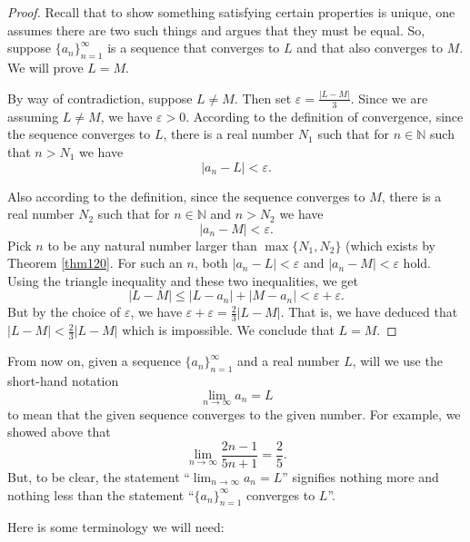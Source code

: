 \documentclass[12pt]{amsart}
\def\e{\varepsilon}
\newcommand{\N}{\mathbb{N}}
\numberwithin{equation}{section}
\theoremstyle{plain} %
\theoremstyle{definition}
\theoremstyle{remark}
\begin{document}
\begin{proof} Recall that to show something satisfying certain properties is unique, one assumes there are two such things and argues that they must be equal. 
So,
suppose $\{a_n\}_{n=1}^\infty$ is a sequence that converges to $L$ and that also converges to $M$. We will prove $L = M$. 

By way of contradiction, suppose $L \ne M$. Then set $\e =
\frac{|L-M|}{3}$. Since we are assuming $L \ne M$, we have $\e > 0$.  
According to the definition of convergence, since the sequence converges to $L$, there is a real number $N_1$ such that for $n \in \N$ such that  $n > N_1$ we have
$$
|a_n - L| < \e.
$$

Also according to the definition, since the sequence converges to $M$, there is a real number $N_2$ such that for $n \in \N$ and  $n > N_2$ we have
$$
|a_n - M| < \e.
$$
Pick $n$ to be any natural number larger than $\max\{N_1, N_2\}$ (which exists by Theorem \ref{thm120}.   For such an $n$, both
$|a_n - L| < \e$ and $ |a_n - M| < \e$ hold. 
Using the triangle inequality and these two inequalities, we get
$$
|L-M| \leq |L-a_n| + |M-a_n| < \e + \e.
$$
But by the choice of $\e$, we have $\e + \e = \frac23 |L-M|$. That is, we have deduced that $|L-M| < \frac23 |L-M|$ which is impossible.
We conclude that $L = M$. 
\end{proof}




From now on, given a sequence $\{a_n\}_{n=1}^\infty$ and a real number $L$, 
will we use the short-hand notation
$$
\lim_{n \to \infty} a_n = L
$$
to mean that the given sequence converges to the given number. For example, we showed above that 
$$
\lim_{n \to \infty} \frac{2n - 1}{5n + 1}   = \frac25.
$$
But, to be clear, the statement ``$\lim_{n \to \infty} a_n = L$''
signifies nothing more and nothing less than the statement
``$\{a_n\}_{n=1}^\infty$ converges to $L$''.



Here is some terminology we will need:
\end{document}
